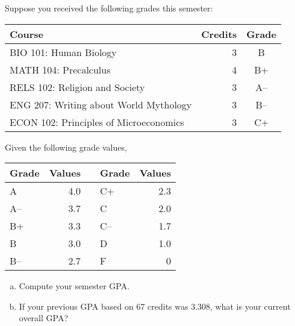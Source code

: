 \documentclass[11pt,letterpaper]{article}
\begin{document}
 Suppose you received the following grades this semester: \par
	\begin{table}[h]
	\centering
	\begin{tabular}{lrc}
	Course & Credits & Grade \\ \hline
	BIO 101: Human Biology & 3 & B \\
	MATH 104: Precalculus & 4 & B+ \\
	RELS 102: Religion and Society & 3 & A-- \\
	ENG 207: Writing about World Mythology & 3 & B-- \\
	ECON 102: Principles of Microeconomics & 3 & C+
	\end{tabular}
	\end{table} \par
Given the following grade values, 
	\begin{table}[h]
	\centering
	\begin{tabular}{lrclr}
	Grade & Values & & Grade & Values \\ \hline
	A & 4.0 & \hspace{1cm} & C+ & 2.3 \\
	A-- & 3.7 & & C & 2.0 \\
	B+ & 3.3 & & C-- & 1.7 \\
	B & 3.0 & & D & 1.0 \\
	B-- & 2.7 & & F & 0
	\end{tabular}
	\end{table}

\begin{enumerate}[(a)]
\item Compute your semester GPA. 
\item If your previous GPA based on 67 credits was 3.308, what is your current overall GPA?
\end{enumerate} \pspace
\end{document}

